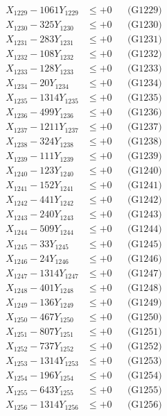 \documentclass[a4paper,10pt]{article}
\begin{document}
{\begin{align}
X_{1229} - 1061Y_{1229} &\leq +0 && \text{(G1229)} \\
X_{1230} - 325Y_{1230} &\leq +0 && \text{(G1230)} \\
\allowbreak
X_{1231} - 283Y_{1231} &\leq +0 && \text{(G1231)} \\
X_{1232} - 108Y_{1232} &\leq +0 && \text{(G1232)} \\
X_{1233} - 128Y_{1233} &\leq +0 && \text{(G1233)} \\
X_{1234} - 20Y_{1234} &\leq +0 && \text{(G1234)} \\
X_{1235} - 1314Y_{1235} &\leq +0 && \text{(G1235)} \\
X_{1236} - 499Y_{1236} &\leq +0 && \text{(G1236)} \\
X_{1237} - 1211Y_{1237} &\leq +0 && \text{(G1237)} \\
X_{1238} - 324Y_{1238} &\leq +0 && \text{(G1238)} \\
X_{1239} - 111Y_{1239} &\leq +0 && \text{(G1239)} \\
X_{1240} - 123Y_{1240} &\leq +0 && \text{(G1240)} \\
\allowbreak
X_{1241} - 152Y_{1241} &\leq +0 && \text{(G1241)} \\
X_{1242} - 441Y_{1242} &\leq +0 && \text{(G1242)} \\
X_{1243} - 240Y_{1243} &\leq +0 && \text{(G1243)} \\
X_{1244} - 509Y_{1244} &\leq +0 && \text{(G1244)} \\
X_{1245} - 33Y_{1245} &\leq +0 && \text{(G1245)} \\
X_{1246} - 24Y_{1246} &\leq +0 && \text{(G1246)} \\
X_{1247} - 1314Y_{1247} &\leq +0 && \text{(G1247)} \\
X_{1248} - 401Y_{1248} &\leq +0 && \text{(G1248)} \\
X_{1249} - 136Y_{1249} &\leq +0 && \text{(G1249)} \\
X_{1250} - 467Y_{1250} &\leq +0 && \text{(G1250)} \\
\allowbreak
X_{1251} - 807Y_{1251} &\leq +0 && \text{(G1251)} \\
X_{1252} - 737Y_{1252} &\leq +0 && \text{(G1252)} \\
X_{1253} - 1314Y_{1253} &\leq +0 && \text{(G1253)} \\
X_{1254} - 196Y_{1254} &\leq +0 && \text{(G1254)} \\
X_{1255} - 643Y_{1255} &\leq +0 && \text{(G1255)} \\
X_{1256} - 1314Y_{1256} &\leq +0 && \text{(G1256)} \\

\end{align}}
\end{document}
